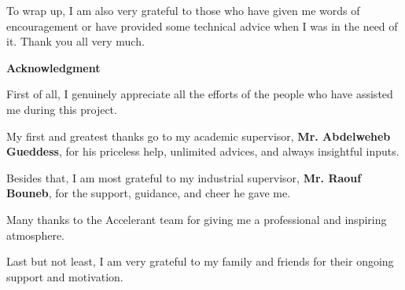 \documentclass[12pt,a4paper]{report}
\begin{document}
To wrap up, I am also very grateful to those who have given me words of encouragement or have provided some technical advice when I was in the need of it. Thank you all very much.

\vfill




\cleardoublepage
\thispagestyle{empty}

\begin{center}
{\LARGE \textbf{Acknowledgment}}
\end{center}

\vspace{1cm}

\linespread{1.3}\selectfont
\large

First of all, I genuinely appreciate all the efforts of the people who have assisted me during this project.

\vspace{1cm}

My first and greatest thanks go to my academic supervisor, \textbf{Mr. Abdelweheb Gueddess}, for his priceless help, unlimited advices, and always insightful inputs.

\vspace{1cm}

Besides that, I am most grateful to my industrial supervisor, \textbf{Mr. Raouf Bouneb}, for the support, guidance, and cheer he gave me.

\vspace{1cm}

Many thanks to the Accelerant team for giving me a professional and inspiring atmosphere.

\vspace{1cm}

Last but not least, I am very grateful to my family and friends for their ongoing support and motivation.

\vfill

\thispagestyle{plain}


\cleardoublepage
\tableofcontents
\thispagestyle{plain}


\cleardoublepage
\listoffigures
\thispagestyle{plain}


\cleardoublepage
\listoftables
\thispagestyle{plain}

\cleardoublepage
{}
\end{document}
